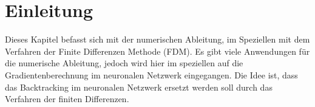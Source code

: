 %
%
%
\section{Einleitung\label{ableitung:section:einleitung}}
Dieses Kapitel befasst sich mit der numerischen Ableitung, im Speziellen mit dem Verfahren der Finite Differenzen Methode (FDM).
Es gibt viele Anwendungen für die numerische Ableitung, jedoch wird hier im speziellen auf die Gradientenberechnung im neuronalen Netzwerk eingegangen.
Die Idee ist, dass das Backtracking im neuronalen Netzwerk ersetzt werden soll durch das Verfahren der finiten Differenzen.

